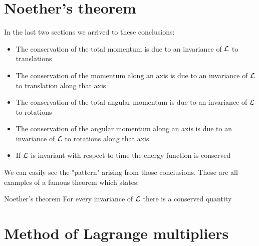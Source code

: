 \section{Noether's theorem}
In the last two sections we arrived to these conclusions:
\begin{itemize}
    \item The conservation of the total momentum is due to an invariance of $\mathcal{L}$ to translations
    \item The conservation of the momentum along an axis is due to an invariance of $\mathcal{L}$ to translation along that axis
    \item The conservation of the total angular momentum is due to an invariance of $\mathcal{L}$ to rotations
    \item The conservation of the angular momentum along an axis is due to an invariance of $\mathcal{L}$ to rotations along that axis
    \item If $\mathcal{L}$ is invariant with respect to time the energy function is conserved
\end{itemize}
We can easily see the "pattern" arising from those conclusions. Those are all examples of a famous theorem which states:
\begin{theorem}{Noether's theorem}
    For every invariance of $\mathcal{L}$ there is a conserved quantity
\end{theorem}
\section{Method of Lagrange multipliers}
